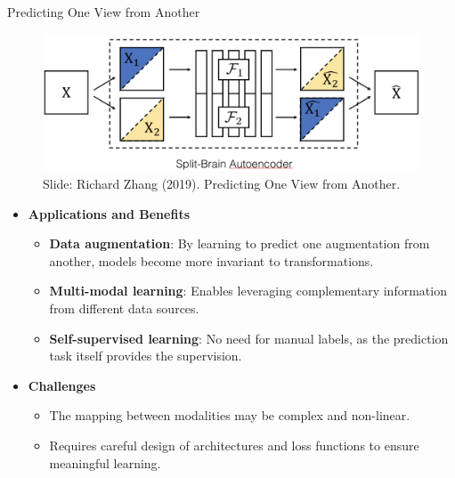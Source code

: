 \begin{frame}[allowframebreaks]{Predicting One View from Another}
    \framebreak

    \begin{figure}
        \flushleft
        \includegraphics[width=1\linewidth,height=\textheight,keepaspectratio]{images/ssl/slide_28_1_img.png}
        Slide: Richard Zhang (2019). Predicting One View from Another.
    \end{figure}

    \framebreak
    
    \begin{itemize} 
        \item \textbf{Applications and Benefits}
        \begin{itemize}
            \item \textbf{Data augmentation}: By learning to predict one augmentation from another, models become more invariant to transformations.
            \item \textbf{Multi-modal learning}: Enables leveraging complementary information from different data sources.
            \item \textbf{Self-supervised learning}: No need for manual labels, as the prediction task itself provides the supervision.
        \end{itemize}
        \item \textbf{Challenges}
        \begin{itemize}
            \item The mapping between modalities may be complex and non-linear.
            \item Requires careful design of architectures and loss functions to ensure meaningful learning.
        \end{itemize}
    \end{itemize}

    
\end{frame}